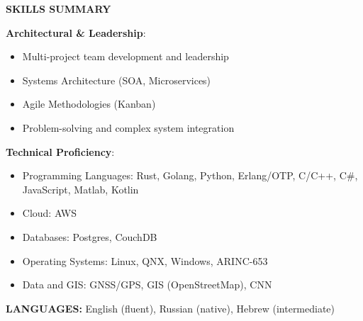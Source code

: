 \documentclass[a4paper]{article}
\begin{document}
    \textbf{SKILLS SUMMARY}
    \vspace{3mm}
    
    \textbf{Architectural \& Leadership}:
	\begin{itemize}
		\item Multi-project team development and leadership 
		\item Systems Architecture (SOA, Microservices)
		\item Agile Methodologies (Kanban)
		\item Problem-solving and complex system integration
	\end{itemize}
    \vspace{3mm}
    
    
    \textbf{Technical Proficiency}: 
	\begin{itemize}
		\item Programming Languages: Rust, Golang, Python, Erlang/OTP, C/C++, C\#, JavaScript, Matlab, Kotlin
		\item Cloud: AWS 
		\item Databases: Postgres, CouchDB
		\item Operating Systems: Linux, QNX, Windows, ARINC-653
		\item Data and GIS: GNSS/GPS, GIS (OpenStreetMap), CNN
	\end{itemize}
    \vspace{5mm}
    
    \textbf{LANGUAGES:} English (fluent), Russian (native), Hebrew (intermediate)
\end{document}
